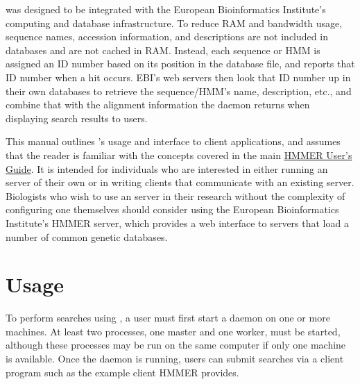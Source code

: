 \documentclass[notoc,justified]{tufte-book}    %
\begin{document}
 was designed to be integrated with the European Bioinformatics Institute's computing and database infrastructure.  To reduce RAM and bandwidth usage, sequence names, accession information, and descriptions are not included in  databases and are not cached in RAM.  Instead, each sequence or HMM is assigned an ID number based on its position in the database file, and  reports that ID number when a hit occurs.  EBI's web servers then look that ID number up in their own databases to retrieve the sequence/HMM's name, description, etc., and combine that with the alignment information the daemon returns when displaying search results to users.

This manual outlines 's usage and interface to client applications, and assumes that the reader is familiar with the concepts covered in the main \underline{HMMER User's Guide}.  It is intended for individuals who are interested in either running an  server of their own or in writing clients that communicate with an existing  server.   Biologists who wish to use an  server in their research without the complexity of configuring one themselves should consider using the European Bioinformatics Institute's HMMER server, which provides a web interface to  servers that load a number of common genetic databases.
 

\chapter{Usage}
To perform searches using , a user must first start a daemon on one or more machines.  At least two  processes, one master and one worker, must be started, although these processes may be run on the same computer if only one machine is available.  Once the daemon is running, users can submit searches via a client program such as the  example client HMMER provides.
\end{document}
